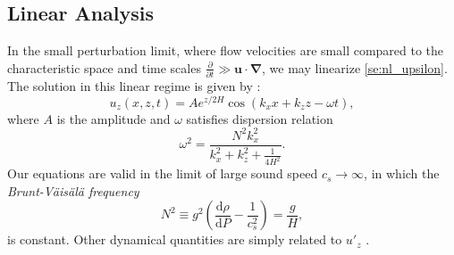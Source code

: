 \documentclass[
        fleqn,
        usenatbib,
        referee,
    ]{mnras}
\newcommand*{\rd}[2]{\frac{\mathrm{d}#1}{\mathrm{d}#2}}
\newcommand*{\pd}[2]{\frac{\partial#1}{\partial#2}}
\newcommand*{\p}[1]{\left(#1\right)}
\newcommand*{\bm}[1]{\mathbf{#1}}
\begin{document}
\subsection{Linear Analysis}

In the small perturbation limit, where flow velocities are small compared to the
characteristic space and time scales $\pd{}{t} \gg \bm{u} \cdot
\bm{\nabla}$, we may linearize \autoref{se:nl_upsilon}. The solution in this
linear regime is given by \citep{drazin,sutherland0}:
\begin{equation}
    u_z\p{x, z, t} = Ae^{z/2H}\cos\p{k_{x}x + k_{z}z - \omega t},
        \label{eq:k0z_sign}
\end{equation}
where $A$ is the amplitude and $\omega$ satisfies dispersion relation
\begin{equation}
    \omega^2 = \frac{N^2k_{x}^2}{k_{x}^2 + k_{z}^2 + \frac{1}{4H^2}}.
        \label{eq:disp_rel}
\end{equation}
Our equations are valid in the limit of large sound speed $c_s \to \infty$, in
which the \emph{Brunt-V\"ais\"al\"a frequency}
\begin{equation}
    N^2 \equiv g^2\p{\rd{\rho}{P} - \frac{1}{c_s^2}} = \frac{g}{H},
\end{equation}
is constant. Other dynamical quantities are simply related to $u'_z$ \citep[see
e.g.][]{sutherland0}.
\end{document}
